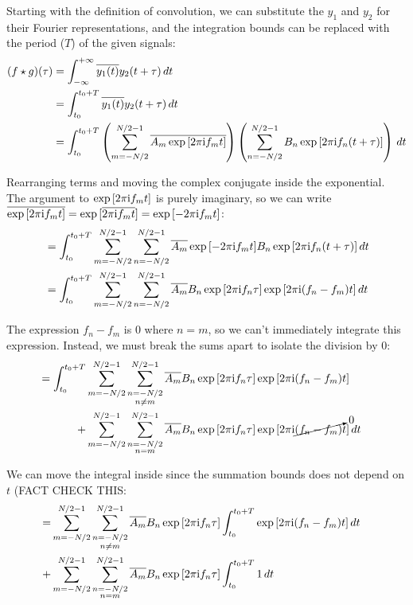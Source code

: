 \documentclass[12pt]{article}
\newenvironment{derivation}[1][Derivation]{\begin{trivlist}
\item[\hskip \labelsep {\bfseries #1:}]}{\end{trivlist}}
\begin{document}
\begin{derivation}

Starting with the definition of convolution, we can substitute the $y_1$ and $y_2$ for their Fourier representations, and the integration bounds can be replaced with the period ($T$) of the given signals:
\begin{align}
(f \star g)(\tau) & = \int_{-\infty}^{+\infty} \overline{y_1(t)} y_2(t+\tau) \,dt \\
& = \int_{t_0}^{t_0+T} \overline{y_1(t)} y_2(t+\tau) \,dt \\
& =  \int_{t_0}^{t_0+T} \left( \sum_{m = -N/2}^{N/2-1} \overline{A_m \exp{[2 \pi\mathrm{i}f_m t]}} \right) \left( \sum_{n = -N/2}^{N/2-1} B_n \exp{[2 \pi\mathrm{i}f_n (t+\tau)]} \right) \,dt
\end{align}

Rearranging terms and moving the complex conjugate inside the exponential. The argument to $\exp{[2 \pi\mathrm{i}f_m t]}$ is purely imaginary, so we can write $\overline{ \exp{[2 \pi\mathrm{i}f_m t]} } = \exp{[\overline{ 2 \pi\mathrm{i}f_m t }]} = \exp{[-2 \pi\mathrm{i}f_m t]}$:
\begin{align}
& =  \int_{t_0}^{t_0+T} \sum_{m = -N/2}^{N/2-1} \sum_{n = -N/2}^{N/2-1} \overline{A_m} \exp{[-2 \pi\mathrm{i}f_m t]} B_n \exp{[2 \pi\mathrm{i}f_n (t+\tau)]} \,dt \\
& =  \int_{t_0}^{t_0+T} \sum_{m = -N/2}^{N/2-1} \sum_{n = -N/2}^{N/2-1} \overline{A_m} B_n \exp{[2 \pi\mathrm{i}f_n \tau]} \exp{[2 \pi\mathrm{i}(f_n-f_m) t]} \,dt
\end{align}

The expression $f_n - f_m$ is $0$ where $n=m$, so we can't immediately integrate this expression. Instead, we must break the sums apart to isolate the division by $0$:
\begin{align}
& \!\begin{aligned}
 =  \int_{t_0}^{t_0+T} & \sum_{m = -N/2}^{N/2-1} \sum_{\substack{n = -N/2 \\ n \neq m}}^{N/2-1} \overline{A_m} B_n \exp{[2 \pi\mathrm{i}f_n \tau]} \exp{[2 \pi\mathrm{i}(f_n-f_m) t]} \\
 + & \sum_{m = -N/2}^{N/2-1} \sum_{\substack{n = -N/2 \\ n=m}}^{N/2-1} \overline{A_m} B_n \exp{[2 \pi\mathrm{i}f_n \tau]} \exp{[2 \pi\mathrm{i}\cancelto{0}{(f_n-f_m)} t ]} \,dt
\end{aligned}
\end{align}

We can move the integral inside since the summation bounds does not depend on $t$ (FACT CHECK THIS:
\begin{align}
& \!\begin{aligned}
 = & \sum_{m = -N/2}^{N/2-1} \sum_{\substack{n = -N/2 \\ n \neq m}}^{N/2-1} \overline{A_m} B_n \exp{[2 \pi\mathrm{i}f_n \tau]} \int_{t_0}^{t_0+T} \exp{[2 \pi\mathrm{i}(f_n-f_m) t]} \,dt \\
 + & \sum_{m = -N/2}^{N/2-1} \sum_{\substack{n = -N/2 \\ n=m}}^{N/2-1} \overline{A_m} B_n \exp{[2 \pi\mathrm{i}f_n \tau]} \int_{t_0}^{t_0+T} 1 \,dt
\end{aligned}
\end{align}


\end{derivation}
\end{document}
